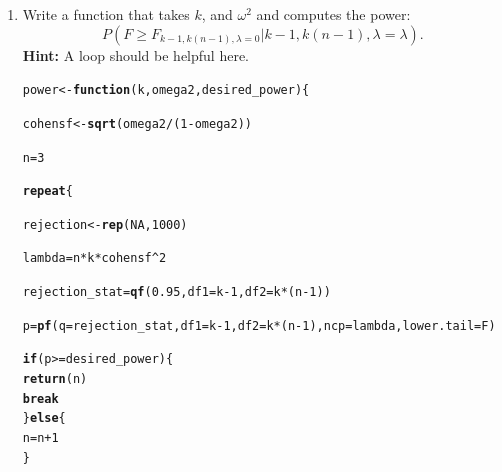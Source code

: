 \documentclass{article}\usepackage[]{graphicx}\usepackage[]{xcolor}
\makeatletter
\newcommand{\hlnum}[1]{\textcolor[rgb]{0.686,0.059,0.569}{#1}}%
\newcommand{\hlopt}[1]{\textcolor[rgb]{0,0,0}{#1}}%
\newcommand{\hldef}[1]{\textcolor[rgb]{0.345,0.345,0.345}{#1}}%
\newcommand{\hlkwa}[1]{\textcolor[rgb]{0.161,0.373,0.58}{\textbf{#1}}}%
\newcommand{\hlkwb}[1]{\textcolor[rgb]{0.69,0.353,0.396}{#1}}%
\newcommand{\hlkwc}[1]{\textcolor[rgb]{0.333,0.667,0.333}{#1}}%
\newcommand{\hlkwd}[1]{\textcolor[rgb]{0.737,0.353,0.396}{\textbf{#1}}}%
\newenvironment{kframe}{%
 \def\at@end@of@kframe{}%
 \ifinner\ifhmode%
  \def\at@end@of@kframe{\end{minipage}}%
  \begin{minipage}{\columnwidth}%
 \fi\fi%
 \def\FrameCommand##1{\hskip\@totalleftmargin \hskip-\fboxsep
 \colorbox{shadecolor}{##1}\hskip-\fboxsep
     \hskip-\linewidth \hskip-\@totalleftmargin \hskip\columnwidth}%
 \MakeFramed {\advance\hsize-\width
   \@totalleftmargin\z@ \linewidth\hsize
   \@setminipage}}%
 {\par\unskip\endMakeFramed%
 \at@end@of@kframe}
\newenvironment{knitrout}{}{} %
\makeatother
\begin{document}
\begin{enumerate}
\begin{enumerate}
\begin{knitrout}
\begin{kframe}
\begin{alltt}
\hlkwd{pf}\hldef{(}\hlkwc{q}\hldef{=rejection_statistic,} \hlkwc{df1} \hldef{= k}\hlopt{-}\hlnum{1}\hldef{,} \hlkwc{df2} \hldef{= n}\hlopt{-}\hldef{k,} \hlkwc{ncp} \hldef{= lambda,} \hlkwc{lower.tail} \hldef{= F)}
\end{alltt}
\begin{verbatim}
## [1] 1
\end{verbatim}
\end{kframe}
\end{knitrout}

\item Write a function that takes $k$, and $\omega^2$ and computes the power:
\[P\left(F \geq F_{k-1, k(n-1), \lambda=0}|k-1, k(n-1), \lambda=\lambda\right).\]
\textbf{Hint:} A loop should be helpful here.

\begin{knitrout}\scriptsize
{}\color{fgcolor}\begin{kframe}
\begin{alltt}
\hldef{power} \hlkwb{<-} \hlkwa{function}\hldef{(}\hlkwc{k}\hldef{,} \hlkwc{omega2}\hldef{,} \hlkwc{desired_power}\hldef{)\{}

  \hldef{cohensf} \hlkwb{<-} \hlkwd{sqrt}\hldef{(omega2}\hlopt{/}\hldef{(}\hlnum{1}\hlopt{-}\hldef{omega2))}

  \hldef{n} \hlkwb{=} \hlnum{3}

  \hlkwa{repeat}\hldef{\{}

    \hldef{rejection} \hlkwb{<-} \hlkwd{rep}\hldef{(}\hlnum{NA}\hldef{,} \hlnum{1000}\hldef{)}

    \hldef{lambda} \hlkwb{=} \hldef{n} \hlopt{*} \hldef{k} \hlopt{*} \hldef{cohensf}\hlopt{^}\hlnum{2}

    \hldef{rejection_stat} \hlkwb{=} \hlkwd{qf}\hldef{(}\hlnum{0.95}\hldef{,} \hlkwc{df1} \hldef{= k}\hlopt{-}\hlnum{1}\hldef{,} \hlkwc{df2} \hldef{= k}\hlopt{*}\hldef{(n}\hlopt{-}\hlnum{1}\hldef{))}

    \hldef{p} \hlkwb{=} \hlkwd{pf}\hldef{(}\hlkwc{q} \hldef{= rejection_stat,} \hlkwc{df1} \hldef{= k}\hlopt{-}\hlnum{1}\hldef{,} \hlkwc{df2} \hldef{= k}\hlopt{*}\hldef{(n}\hlopt{-}\hlnum{1}\hldef{),} \hlkwc{ncp} \hldef{= lambda,} \hlkwc{lower.tail} \hldef{= F)}

    \hlkwa{if}\hldef{(p} \hlopt{>=} \hldef{desired_power)\{}
      \hlkwd{return}\hldef{(n)}
      \hlkwa{break}
    \hldef{\}}\hlkwa{else}\hldef{\{}
      \hldef{n} \hlkwb{=} \hldef{n} \hlopt{+} \hlnum{1}
    \hldef{\}}


\end{alltt}
\end{kframe}
\end{knitrout}
\end{enumerate}
\end{enumerate}
\end{document}
